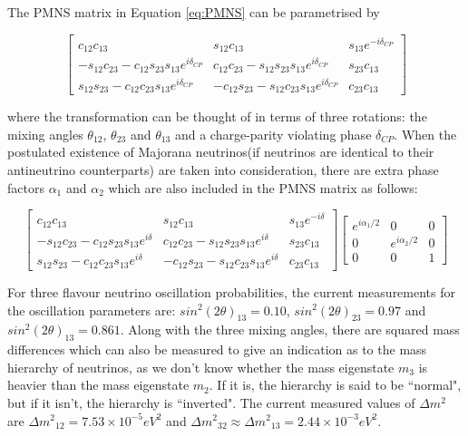 \documentclass[11pt,oneside,a4paper]{article}
\begin{document}
The PMNS matrix in Equation \ref{eq:PMNS} can be parametrised by

\begin{equation}
\label{eq:PMNSparametrised}
\left[ \begin{array}{ccc}{c_{12} c_{13}} & {s_{12} c_{13}} & {s_{13} e^{-i \delta_{C P}}} \\ {-s_{12} c_{23}-c_{12} s_{23} s_{13} e^{i \delta_{C P}}} & {c_{12} c_{23}-s_{12} s_{23} s_{13} e^{i \delta_{C P}}} & {s_{23} c_{13}} \\ {s_{12} s_{23}-c_{12} c_{23} s_{13} e^{i \delta_{C P}}} & {-c_{12} s_{23}-s_{12} c_{23} s_{13} e^{i \delta_{C P}}} & {c_{23} c_{13}}\end{array}\right]
\end{equation}

where the transformation can be thought of in terms of three rotations: the mixing angles $\theta_{12}$, $\theta_{23}$ and $\theta_{13}$ and a charge-parity violating phase $\delta_{CP}$. When the postulated existence of Majorana neutrinos(if neutrinos are identical to their antineutrino counterparts) are taken into consideration, there are extra phase factors $\alpha_{1}$ and $\alpha_{2}$ which are also included in the PMNS matrix as follows:

\begin{equation}
\label{eq:PMNSmajorana}
\left[ \begin{array}{ccc}{c_{12} c_{13}} & {s_{12} c_{13}} & {s_{13} e^{-i \delta}} \\ {-s_{12} c_{23}-c_{12} s_{23} s_{13} e^{i \delta}} & {c_{12} c_{23}-s_{12} s_{23} s_{13} e^{i \delta}} & {s_{23} c_{13}} \\ {s_{12} s_{23}-c_{12} c_{23} s_{13} e^{i \delta}} & {-c_{12} s_{23}-s_{12} c_{23} s_{13} e^{i \delta}} & {c_{23} c_{13}}\end{array}\right] \left[ \begin{array}{ccc}{e^{i \alpha_{1} / 2}} & {0} & {0} \\ {0} & {e^{i \alpha_{2} / 2}} & {0} \\ {0} & {0} & {1}\end{array}\right]
\end{equation}

For three flavour neutrino oscillation probabilities, the current measurements for the oscillation parameters are: $sin^2(2\theta)_{13} = 0.10$, $sin^2(2\theta)_{23} = 0.97$ and $sin^2(2\theta)_{13} = 0.861$. Along with the three mixing angles, there are squared mass differences which can also be measured to give an indication as to the mass hierarchy of neutrinos, as we don't know whether the mass eigenstate $m_{3}$ is heavier than the mass eigenstate $m_{2}$. If it is, the hierarchy is said to be ``normal", but if it isn't, the hierarchy is ``inverted".  The current measured values of $\Delta m^{2}$ are $\Delta{m^2}_{12} = 7.53 \times 10^{−5} eV^2$ and $\Delta{m^2}_{32} \approx \Delta{m^2}_{13} = 2.44 \times 10^{−3} eV^2$.
\end{document}
